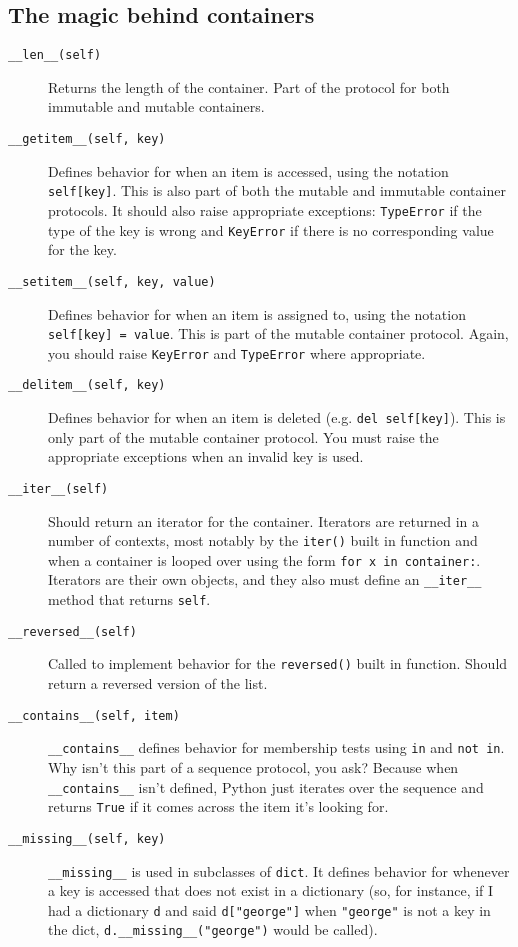 \documentclass[a4paper,11pt]{article}
\newcommand{\code}[1]{\texttt{#1}}
\begin{document}
\subsection{The magic behind containers}
\begin{description}

\item[\code{__len__(self)}]
Returns the length of the container. Part of the protocol for both immutable and mutable containers.
\item[\code{__getitem__(self, key)}]
Defines behavior for when an item is accessed, using the notation \code{self[key]}. This is also part of both the mutable and immutable container protocols. It should also raise appropriate exceptions: \code{TypeError} if the type of the key is wrong and \code{KeyError} if there is no corresponding value for the key.
\item[\code{__setitem__(self, key, value)}]
Defines behavior for when an item is assigned to, using the notation \code{self[key] = value}. This is part of the mutable container protocol. Again, you should raise \code{KeyError} and \code{TypeError} where appropriate.
\item[\code{__delitem__(self, key)}]
Defines behavior for when an item is deleted (e.g. \code{del self[key]}). This is only part of the mutable container protocol. You must raise the appropriate exceptions when an invalid key is used.
\item[\code{__iter__(self)}]
Should return an iterator for the container. Iterators are returned in a number of contexts, most notably by the \code{iter()} built in function and when a container is looped over using the form \code{for x in container:}. Iterators are their own objects, and they also must define an \code{__iter__} method that returns \code{self}.
\item[\code{__reversed__(self)}]
Called to implement behavior for the \code{reversed()} built in function. Should return a reversed version of the list.
\item[\code{__contains__(self, item)}]
\code{__contains__} defines behavior for membership tests using \code{in} and \code{not in}. Why isn't this part of a sequence protocol, you ask? Because when \code{__contains__} isn't defined, Python just iterates over the sequence and returns \code{True} if it comes across the item it's looking for.
\item[\code{__missing__(self, key)}]
\code{__missing__} is used in subclasses of \code{dict}. It defines behavior for whenever a key is accessed that does not exist in a dictionary (so, for instance, if I had a dictionary \code{d} and said \code{d["george"]} when \code{"george"} is not a key in the dict, \code{d.__missing__("george")} would be called).

\end{description}
\end{document}

